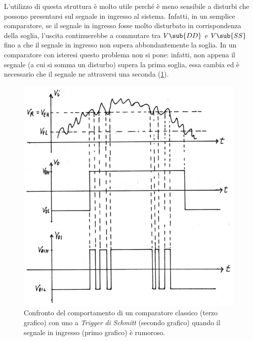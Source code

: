 \noindent
L'utilizzo di questa struttura è molto utile perché è meno sensibile a disturbi che possono presentarsi sul segnale in ingresso al sistema. Infatti, in un semplice comparatore, se il segnale in ingresso fosse molto disturbato in corrispondenza della soglia, l'uscita continuerebbe a commutare tra $V\sub{DD}$ e $V\sub{SS}$ fino a che il segnale in ingresso non supera abbondantemente la soglia. In un comparatore con isteresi questo problema non si pone: infatti, non appena il segnale (a cui si somma un disturbo) supera la prima soglia, essa cambia ed è necessario che il segnale ne attraversi una seconda (\Fig\ref{fig:trigger_di_shmitt_vantaggi}).

\begin{figure}[h!]
	\centering
	\includegraphics[width=0.8\linewidth]{./ImageFiles/Laboratorio 3/Usicta Rumorosa e Trigger di Shmitt.jpg}
	\caption{Confronto del comportamento di un comparatore classico (terzo grafico) con uno a \textit{Trigger di Schmitt} (secondo grafico) quando il segnale in ingresso (primo grafico) è rumoroso.}
	\label{fig:trigger_di_shmitt_vantaggi}
\end{figure} 

